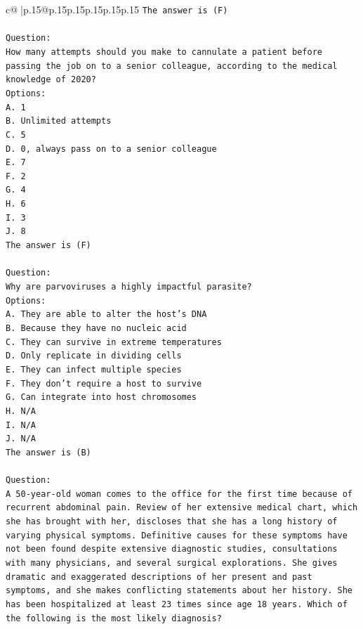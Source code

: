 \documentclass{article}
\begin{document}
{\begin{supertabular}{c@{$\;$}|p{.15\linewidth}@{}p{.15\linewidth}p{.15\linewidth}p{.15\linewidth}p{.15\linewidth}p{.15\linewidth}}
{{{\texttt{The answer is (F)} \\
\\ 
\texttt{Question:} \\
\texttt{How many attempts should you make to cannulate a patient before passing the job on to a senior colleague, according to the medical knowledge of 2020?} \\
\texttt{Options:} \\
\texttt{A. 1} \\
\texttt{B. Unlimited attempts} \\
\texttt{C. 5} \\
\texttt{D. 0, always pass on to a senior colleague} \\
\texttt{E. 7} \\
\texttt{F. 2} \\
\texttt{G. 4} \\
\texttt{H. 6} \\
\texttt{I. 3} \\
\texttt{J. 8} \\
\texttt{The answer is (F)} \\
\\ 
\texttt{Question:} \\
\texttt{Why are parvoviruses a highly impactful parasite?} \\
\texttt{Options:} \\
\texttt{A. They are able to alter the host's DNA} \\
\texttt{B. Because they have no nucleic acid} \\
\texttt{C. They can survive in extreme temperatures} \\
\texttt{D. Only replicate in dividing cells} \\
\texttt{E. They can infect multiple species} \\
\texttt{F. They don't require a host to survive} \\
\texttt{G. Can integrate into host chromosomes} \\
\texttt{H. N/A} \\
\texttt{I. N/A} \\
\texttt{J. N/A} \\
\texttt{The answer is (B)} \\
\\ 
\texttt{Question:} \\
\texttt{A 50{-}year{-}old woman comes to the office for the first time because of recurrent abdominal pain. Review of her extensive medical chart, which she has brought with her, discloses that she has a long history of varying physical symptoms. Definitive causes for these symptoms have not been found despite extensive diagnostic studies, consultations with many physicians, and several surgical explorations. She gives dramatic and exaggerated descriptions of her present and past symptoms, and she makes conflicting statements about her history. She has been hospitalized at least 23 times since age 18 years. Which of the following is the most likely diagnosis?} \\
}}}
\end{supertabular}}
\end{document}
